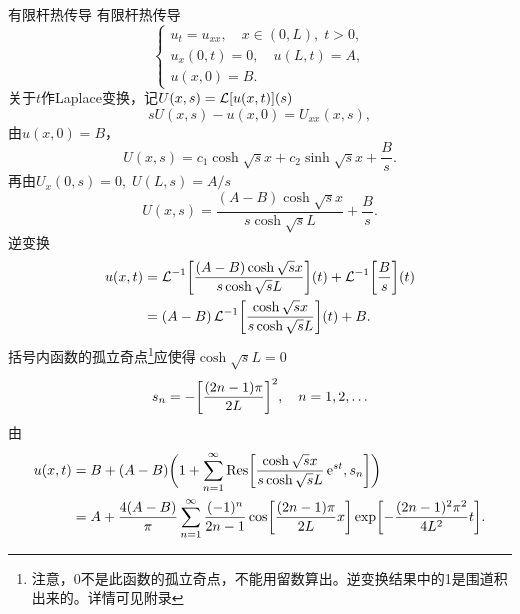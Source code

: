 \begin{example}{有限杆热传导}{}
	有限杆热传导
	\[
		\begin{cases}
			u_t = u_{xx},\quad x \in (0,L),\;t > 0,     \\
			u_x(0,t) = 0,\quad u(L,t) = A, \\
			u(x,0) = B.
		\end{cases}
	\]
	关于$t$作Laplace变换，记$U(x,s) = \operatorname{\mathcal L}[u(x,t)](s)$
	\[
		s U(x,s) - u(x,0) = U_{xx}(x,s),
	\]
	由$u(x,0) = B$，
	\[
		U(x,s) = c_1\cosh\sqrt s x + c_2\sinh\sqrt s x + \frac Bs.
	\]
	再由$U_x(0,s) = 0,\;U(L,s) = A/s$
	\[
		U(x,s) = \frac{(A - B)\cosh\sqrt s x}{s\cosh\sqrt s L} + \frac Bs.
	\]
	逆变换
	\begin{align*}
		u(x,t) &= \operatorname{\mathcal L}^{-1}\biggl[\frac{(A - B)\cosh\sqrt s x}{s\cosh\sqrt s L}\biggr](t) + \operatorname{\mathcal L}^{-1}\biggl[\frac Bs\biggr](t)\\
		&= (A - B)\operatorname{\mathcal L}^{-1}\biggl[\frac{\cosh\sqrt s x}{s\cosh\sqrt s L}\biggr](t) + B.
	\end{align*}
	括号内函数的孤立奇点\footnote{注意，0不是此函数的孤立奇点，不能用留数算出。逆变换结果中的1是围道积出来的。详情可见附录}应使得$\cosh\sqrt s L = 0$
	\[
		s_n = -\biggl[\frac{(2n - 1)\pi}{2L}\biggr]^2,\quad n = 1,2,\ldots
	\]
	由
	\begin{align}
		u(x,t) &= B + (A - B)\biggl(1 + \sum_{n=1}^\infty\operatorname{Res}\biggl[\frac{\cosh\sqrt s x}{s\cosh\sqrt s L}\mathop{}\!\mathrm{e}^{s t},s_n\biggr]\biggr)\notag\\
		&= A + \frac{4(A - B)}\pi\sum_{n=1}^\infty\frac{(-1)^n}{2n - 1}\cos\biggl[\frac{(2n - 1)\pi}{2L}x\biggr]\exp\biggl[-\frac{(2n - 1)^2\pi^2}{4L^2}t\biggr].\label{eq:mmp-mixed-rod-temperature}
	\end{align}
\end{example}
